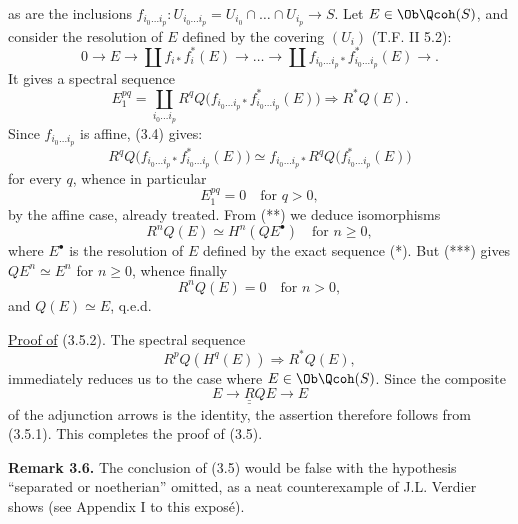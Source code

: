 %
as are the inclusions $f_{i_0\ldots i_p}:U_{i_0\ldots i_p}=U_{i_0}\cap\ldots\cap U_{i_p}\longrightarrow S$. Let $E\in\Ob\Qcoh(S)$, and consider the resolution of $E$ defined by the covering $(U_i)$ (T.F. II 5.2):
\begin{equation}\tag{*}
 0\longrightarrow E\longrightarrow \coprod f_{i*}f_i^*(E)\longrightarrow\ldots\longrightarrow
 \coprod f_{i_0\ldots i_p*}f_{i_0\ldots i_p}^*(E)\longrightarrow .
\end{equation}
It gives a spectral sequence
\begin{equation}\tag{**}
 E_1^{pq}=\coprod_{i_0\ldots i_p}R^qQ\bigl(f_{i_0\ldots i_p*}f_{i_0\ldots i_p}^*(E)\bigr)
 \Longrightarrow R^{*}Q(E).
\end{equation}
Since $f_{i_0\ldots i_p}$ is affine, (3.4) gives:
\begin{equation}\tag{***}
 R^qQ\bigl(f_{i_0\ldots i_p*}f_{i_0\ldots i_p}^*(E)\bigr)
 \simeq f_{i_0\ldots i_p*}R^qQ\bigl(f_{i_0\ldots i_p}^*(E)\bigr)
\end{equation}
for every $q$, whence in particular
\[
 E_1^{pq}=0\quad\text{for }q>0,
\]
by the affine case, already treated. From (**) we deduce isomorphisms
\[
 R^nQ(E)\simeq H^n(QE^\bullet)\quad\text{for }n\geq0,
\]
where $E^\bullet$ is the resolution of $E$ defined by the exact sequence (*). But (***) gives $QE^n\simeq E^n$ for $n\geq0$, whence finally
\[
 R^nQ(E)=0\quad\text{for }n>0,
\]
and $Q(E)\simeq E$, q.e.d.

\uline{Proof of} (3.5.2). The spectral sequence
\[
 R^pQ(H^q(E))\Longrightarrow R^{*}Q(E),
\]
%
immediately reduces us to the case where $E\in\Ob\Qcoh(S)$. Since the composite
\[
 E\longrightarrow \underline{\underline{R}}QE\longrightarrow E
\]
of the adjunction arrows is the identity, the assertion therefore follows from (3.5.1). This completes the proof of (3.5).

\textbf{Remark 3.6.} The conclusion of (3.5) would be false with the hypothesis \textquotedblleft separated or noetherian\textquotedblright{} omitted, as a neat counterexample of J.L. Verdier shows (see Appendix I to this exposé).

